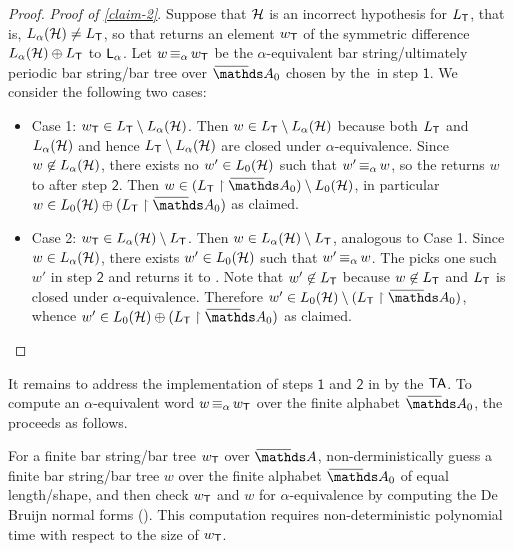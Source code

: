\documentclass[a4paper,UKenglish,cleveref,autoref,thm-restate,numberwithinsect,final]{lipics-v2021}
\begin{document}
\begin{proof}
\smallskip\noindent \emph{Proof of \cref{claim-2}}. Suppose that $\mathcal{H}$ is an incorrect hypothesis for $L_\textsf{T}$, that is, $L_\alpha(\mathcal{H})\neq L_\textsf{T}$, so that \teach returns an element $w_\textsf{T}$ of the symmetric difference $L_\alpha(\mathcal{H}) \oplus L_\textsf{T}$ to $\textsf{L}_\alpha$. Let $w\operatorname{\equiv_{\alpha}} w_\textsf{T}$ be the $\alpha$-equivalent bar string/ultimately periodic bar string/bar tree over $\barNames_0$ chosen by the~\tass in step $\mathsf{1}$. We consider the following two cases:
\begin{itemize}
\item Case 1: $w_\textsf{T}\in L_\textsf{T}\setminus L_\alpha(\mathcal{H})$. Then $w\in L_\textsf{T}\setminus L_\alpha(\mathcal{H})$ because both $L_\textsf{T}$ and $L_\alpha(\mathcal{H})$ and hence $L_\textsf{T}\setminus L_\alpha(\mathcal{H})$ are closed under $\alpha$-equivalence. Since $w\not\in L_\alpha(\mathcal{H})$, there exists no $w'\in L_0(\mathcal{H})$ such that $w'\operatorname{\equiv_{\alpha}} w$, so the \tass returns $w$ to \learn after step $\mathsf{2}$. Then $w\in (L_\teach\restriction \barNames_0)\setminus L_0(\H)$, in particular $w\in  L_0(\H)\oplus (L_\teach\restriction \barNames_0)$ as claimed.
\item Case 2: $w_\textsf{T}\in L_\alpha(\mathcal{H})\setminus L_\textsf{T}$. Then $w\in L_\alpha(\mathcal{H})\setminus L_\textsf{T}$, analogous to Case 1. Since $w\in L_\alpha(\mathcal{H})$, there exists $w'\in L_0(\mathcal{H})$ such that $w'\operatorname{\equiv_{\alpha}} w$. The \tass picks one such $w'$ in step $\mathsf{2}$ and returns it to \learn. Note that $w'\not\in L_\textsf{T}$ because $w\not\in L_\textsf{T}$ and $L_\textsf{T}$ is closed under $\alpha$-equivalence. Therefore $w'\in L_0(\H)\setminus (L_\teach\restriction \barNames_0)$, whence $w'\in L_0(\H)\oplus (L_\teach\restriction \barNames_0)$ as claimed.\qedhere
\end{itemize}   



    \end{proof}
It remains to address the implementation of steps $\mathsf{1}$ and $\mathsf{2}$ in  by the $\textsf{TA}$.
     To compute an $\alpha$-equivalent word $w \operatorname{\equiv_{\alpha}} w_\textsf{T}$ over the finite
    alphabet $\barNames_0$, the \tass proceeds as follows.
    
    For a finite bar string/bar tree $w_\textsf{T}$ over $\barNames$, non-derministically guess a finite bar string/bar tree $w$ over the finite
    alphabet $\barNames_0$ of equal length/shape, and then check $w_\textsf{T}$ and $w$ for $\alpha$-equivalence by computing the De Bruijn normal forms 
    (). This computation requires non-deterministic
    polynomial time with respect to the size of $w_\textsf{T}$.
\end{document}
